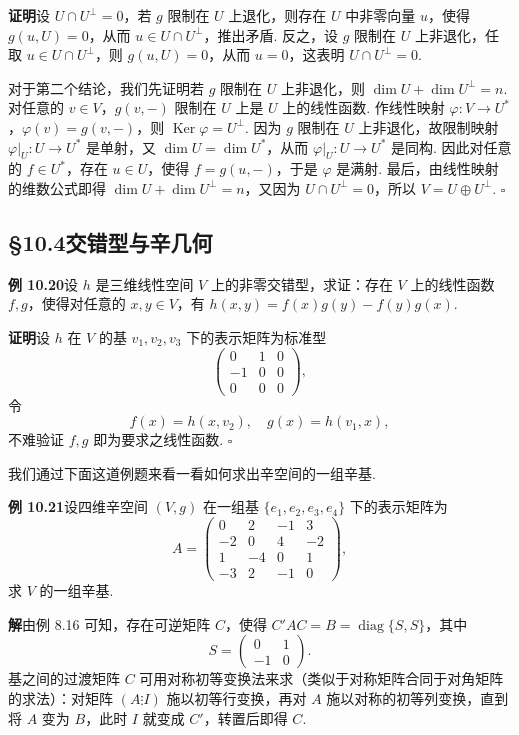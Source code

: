 \documentclass[UTF8,12pt,a4paper,fontset=fandol]{ctexart}
\begin{document}
\noindent\textbf{证明}\quad 设 $U\cap U^\perp=0$，若 $g$ 限制在 $U$ 上退化，则存在 $U$ 中非零向量 $u$，使得 $g(u,U)=0$，从而 $u\in U\cap U^\perp$，推出矛盾. 反之，设 $g$ 限制在 $U$ 上非退化，任取 $u\in U\cap U^\perp$，则 $g(u,U)=0$，从而 $u=0$，这表明 $U\cap U^\perp=0$.

对于第二个结论，我们先证明若 $g$ 限制在 $U$ 上非退化，则 $\dim U+\dim U^\perp=n$. 对任意的 $v\in V$，$g(v,-)$ 限制在 $U$ 上是 $U$ 上的线性函数. 作线性映射 $\varphi:V\to U^*$，$\varphi(v)=g(v,-)$，则 $\operatorname{Ker}\varphi=U^\perp$. 因为 $g$ 限制在 $U$ 上非退化，故限制映射 $\varphi|_U:U\to U^*$ 是单射，又 $\dim U=\dim U^*$，从而 $\varphi|_U:U\to U^*$ 是同构. 因此对任意的 $f\in U^*$，存在 $u\in U$，使得 $f=g(u,-)$，于是 $\varphi$ 是满射. 最后，由线性映射的维数公式即得 $\dim U+\dim U^\perp=n$，又因为 $U\cap U^\perp=0$，所以 $V=U\oplus U^\perp$. $\square$

\subsection*{§10.4\quad 交错型与辛几何}

\noindent\textbf{例 10.20}\quad 设 $h$ 是三维线性空间 $V$ 上的非零交错型，求证：存在 $V$ 上的线性函数 $f,g$，使得对任意的 $x,y\in V$，有 $h(x,y)=f(x)g(y)-f(y)g(x)$.

\noindent\textbf{证明}\quad 设 $h$ 在 $V$ 的基 $v_1,v_2,v_3$ 下的表示矩阵为标准型
\[
\left(\begin{array}{ccc}
0 & 1 & 0\\
-1 & 0 & 0\\
0 & 0 & 0
\end{array}\right),
\]
令
\[
f(x)=h(x,v_2),\quad g(x)=h(v_1,x),
\]
不难验证 $f,g$ 即为要求之线性函数. $\square$

我们通过下面这道例题来看一看如何求出辛空间的一组辛基.

\noindent\textbf{例 10.21}\quad 设四维辛空间 $(V,g)$ 在一组基 $\{e_1,e_2,e_3,e_4\}$ 下的表示矩阵为
\[
A=\left(\begin{array}{rrrr}
0 & 2 & -1 & 3\\
-2 & 0 & 4 & -2\\
1 & -4 & 0 & 1\\
-3 & 2 & -1 & 0
\end{array}\right),
\]
求 $V$ 的一组辛基.

\noindent\textbf{解}\quad 由例 8.16 可知，存在可逆矩阵 $C$，使得 $C'AC=B=\operatorname{diag}\{S,S\}$，其中
\[
S=\left(\begin{array}{cc}
0 & 1\\
-1 & 0
\end{array}\right).
\]
基之间的过渡矩阵 $C$ 可用对称初等变换法来求（类似于对称矩阵合同于对角矩阵的求法）：对矩阵 $(A\vdots I)$ 施以初等行变换，再对 $A$ 施以对称的初等列变换，直到将 $A$ 变为 $B$，此时 $I$ 就变成 $C'$，转置后即得 $C$.
\end{document}
